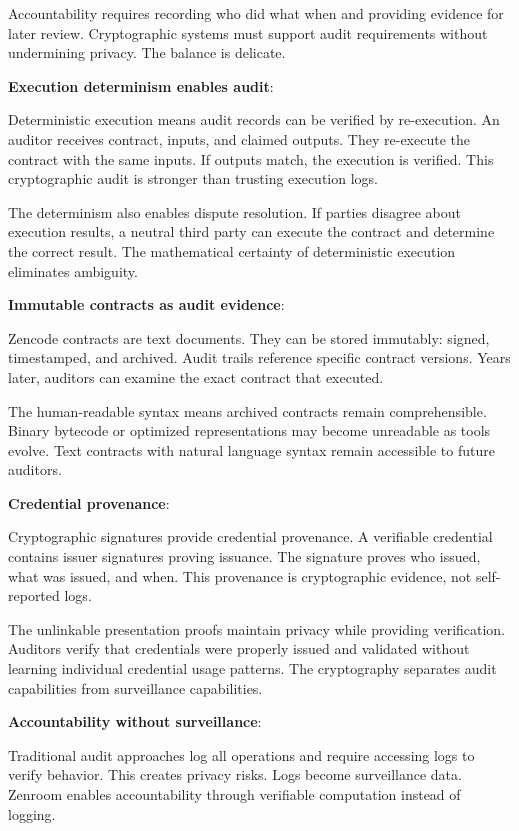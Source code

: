 Accountability requires recording who did what when and providing
evidence for later review. Cryptographic systems must support audit
requirements without undermining privacy. The balance is delicate.

\textbf{Execution determinism enables audit}:

Deterministic execution means audit records can be verified by
re-execution. An auditor receives contract, inputs, and claimed
outputs. They re-execute the contract with the same inputs. If outputs
match, the execution is verified. This cryptographic audit is stronger
than trusting execution logs.

The determinism also enables dispute resolution. If parties disagree
about execution results, a neutral third party can execute the
contract and determine the correct result. The mathematical certainty
of deterministic execution eliminates ambiguity.

\textbf{Immutable contracts as audit evidence}:

Zencode contracts are text documents. They can be stored immutably:
signed, timestamped, and archived. Audit trails reference specific
contract versions. Years later, auditors can examine the exact
contract that executed.

The human-readable syntax means archived contracts remain
comprehensible. Binary bytecode or optimized representations may
become unreadable as tools evolve. Text contracts with natural
language syntax remain accessible to future auditors.

\textbf{Credential provenance}:

Cryptographic signatures provide credential provenance. A verifiable
credential contains issuer signatures proving issuance. The signature
proves who issued, what was issued, and when. This provenance is
cryptographic evidence, not self-reported logs.

The unlinkable presentation proofs maintain privacy while providing
verification. Auditors verify that credentials were properly issued
and validated without learning individual credential usage
patterns. The cryptography separates audit capabilities from
surveillance capabilities.

\textbf{Accountability without surveillance}:

Traditional audit approaches log all operations and require accessing
logs to verify behavior. This creates privacy risks. Logs become
surveillance data. Zenroom enables accountability through verifiable
computation instead of logging.

